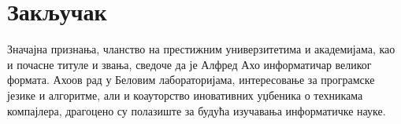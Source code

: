 \documentclass[a4paper]{article}
\begin{document}
\section{Закључак}
\label{sec:zakljucak}
Значајна признања, чланство на престижним универзитетима и академијама, као и почасне титуле и звања, сведоче да је Алфред Ахо информатичар великог формата. Ахоов рад у Беловим лабораторијама, интересовање за програмске језике и алгоритме, али и коауторство иновативних уџбеника о техникама компајлера, драгоцено су полазиште за будућа изучавања информатичке науке.
\appendix


\end{document}
